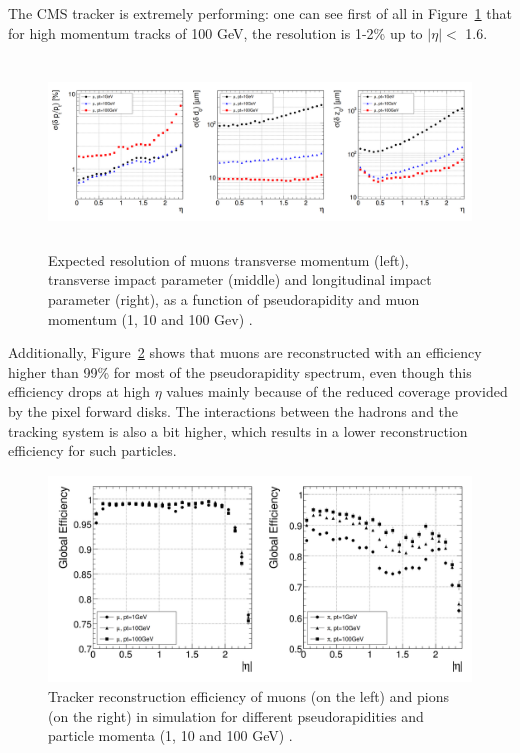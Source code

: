 \documentclass[a4paper, 10pt, openright]{report}
\begin{document}
The \ac{CMS} tracker is extremely performing: one can see first of all in Figure~\ref{fig:TrackerRes} that for high momentum tracks of 100 GeV, the resolution is 1-2\% up to $|\eta| <$ 1.6. 

\begin{figure}[htbp]
\begin{center}
\includegraphics[width=15cm, height=5cm]{figs/TrackerRes.png}
\caption{Expected resolution of muons transverse momentum (left), transverse impact parameter (middle) and longitudinal impact parameter (right), as a function of pseudorapidity and muon momentum (1, 10 and 100 Gev) \cite{CMSDescription}.}
\label{fig:TrackerRes}
\end{center}
\end{figure}

Additionally, Figure~\ref{fig:TrackerEff} shows that muons are reconstructed with an efficiency higher than 99\% for most of the pseudorapidity spectrum, even though this efficiency drops at high $\eta$ values mainly because of the reduced coverage provided by the pixel forward disks. The interactions between the hadrons and the tracking system is also a bit higher, which results in a lower reconstruction efficiency for such particles.

\begin{figure}[htbp]
\begin{center}
\includegraphics[width=12cm, height=5.5cm]{figs/TrackerEff.png}
\caption{Tracker reconstruction efficiency of muons (on the left) and pions (on the right) in simulation for different pseudorapidities and particle momenta (1, 10 and 100 GeV) \cite{CMSDescription}.}
\label{fig:TrackerEff}
\end{center}
\end{figure}
\end{document}
